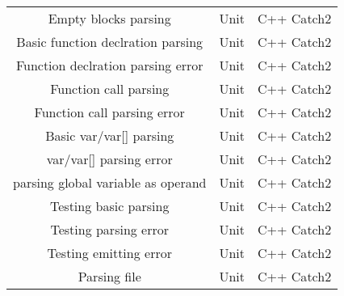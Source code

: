 \documentclass[manuscript,screen,nonacm]{acmart}
\begin{document}
\begin{center}
\begin{tabular}{|c|c|c|}
    Empty blocks parsing & Unit & C++ Catch2 \\
    Basic function declration parsing & Unit & C++ Catch2 \\
    Function declration parsing error & Unit & C++ Catch2 \\
    Function call parsing & Unit & C++ Catch2 \\
    Function call parsing error & Unit & C++ Catch2 \\
    Basic var/var[] parsing & Unit & C++ Catch2 \\
    var/var[] parsing error & Unit & C++ Catch2 \\
    parsing global variable as operand & Unit & C++ Catch2 \\
    Testing basic parsing & Unit & C++ Catch2 \\
    Testing parsing error & Unit & C++ Catch2 \\
    Testing emitting error & Unit & C++ Catch2 \\
    Parsing file & Unit & C++ Catch2 \\
    \hline
\end{tabular}
\end{center}
\end{document}

